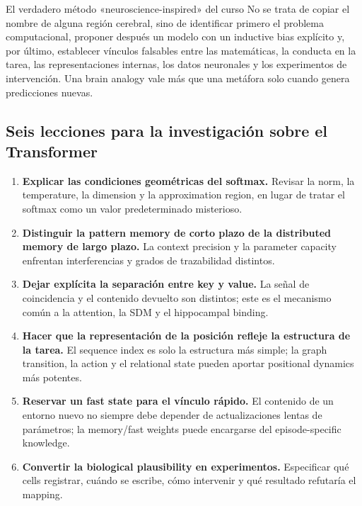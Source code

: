 \begin{importantbox}{El verdadero método «neuroscience-inspired» del curso}
No se trata de copiar el nombre de alguna región cerebral, sino de identificar primero el problema computacional, proponer después un modelo con un inductive bias explícito y, por último, establecer vínculos falsables entre las matemáticas, la conducta en la tarea, las representaciones internas, los datos neuronales y los experimentos de intervención. Una brain analogy vale más que una metáfora solo cuando genera predicciones nuevas.
\end{importantbox}

\subsection{Seis lecciones para la investigación sobre el Transformer}

\begin{enumerate}
  \item \textbf{Explicar las condiciones geométricas del softmax.} Revisar la norm, la temperature, la dimension y la approximation region, en lugar de tratar el softmax como un valor predeterminado misterioso.
  \item \textbf{Distinguir la pattern memory de corto plazo de la distributed memory de largo plazo.} La context precision y la parameter capacity enfrentan interferencias y grados de trazabilidad distintos.
  \item \textbf{Dejar explícita la separación entre key y value.} La señal de coincidencia y el contenido devuelto son distintos; este es el mecanismo común a la attention, la SDM y el hippocampal binding.
  \item \textbf{Hacer que la representación de la posición refleje la estructura de la tarea.} El sequence index es solo la estructura más simple; la graph transition, la action y el relational state pueden aportar positional dynamics más potentes.
  \item \textbf{Reservar un fast state para el vínculo rápido.} El contenido de un entorno nuevo no siempre debe depender de actualizaciones lentas de parámetros; la memory/fast weights puede encargarse del episode-specific knowledge.
  \item \textbf{Convertir la biological plausibility en experimentos.} Especificar qué cells registrar, cuándo se escribe, cómo intervenir y qué resultado refutaría el mapping.
\end{enumerate}

